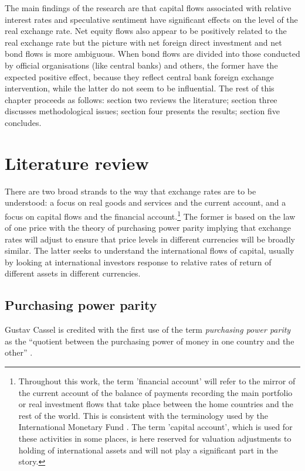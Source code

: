 \documentclass[12pt, a4paper, oneside]{article}\usepackage[]{graphicx}\usepackage[]{color}
\begin{document}
The main findings of the research are that capital flows associated with relative interest rates and speculative sentiment have significant effects on the level of the real exchange rate.  Net equity flows also appear to be positively related to the real exchange rate but the picture with net foreign direct investment and net bond flows is more ambiguous.  When bond flows are divided into those conducted by official organisations (like central banks) and others, the former have the expected positive effect, because they reflect central bank foreign exchange intervention, while the latter do not seem to be influential. The rest of this chapter proceeds as follows: section two reviews the literature; section three discusses methodological issues; section four presents the results; section five concludes. 
  
\section{Literature review}
There are two broad strands to the way that exchange rates are to be understood:  a focus on real goods and services and the current account, and a focus on capital flows and the financial account.\footnote{Throughout this work, the term 'financial account' will refer to the mirror of the current account of the balance of payments recording the main portfolio or real investment flows that take place between the home countries and the rest of the world.  This is consistent with the terminology used by the International Monetary Fund \citep[ch.2 p. 9]{IMFBOP}.  The term 'capital account', which is used for these activities in some places, is here reserved for valuation adjustments to holding of international assets and will not play a significant part in the story.} The former is based on the law of one price with the theory of purchasing power parity implying that exchange rates will adjust to ensure that price levels in different currencies will be broadly similar.  The latter seeks to understand the international flows of capital, usually by looking at international investors response to relative rates of return of different assets in different currencies.  

\subsection{Purchasing power parity}  
Gustav Cassel is credited with the first use of the term \emph{purchasing power parity} as the ``quotient between the purchasing power of money in one country and the other'' \citep[p.298]{Cassel1916Present}.  
\end{document}
